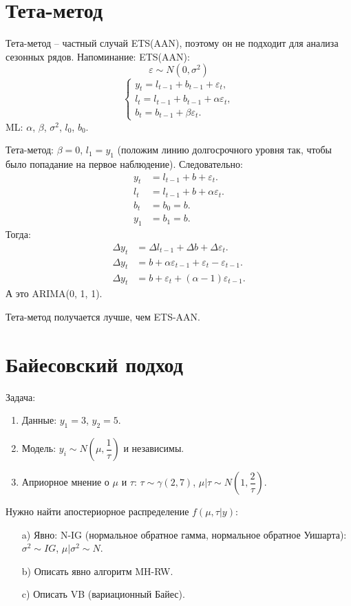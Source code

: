 \documentclass[10pt, a4paper]{extarticle}
\begin{document}
\section{Тета-метод}

Тета-метод -- частный случай ETS(AAN), поэтому он не подходит для анализа сезонных рядов. Напоминание: ETS(AAN):
\[
\varepsilon \sim N(0, \sigma^2)
\]
\[
\begin{cases}
	y_t = l_{t-1} + b_{t-1} + \varepsilon_t, \\
	l_t =  l_{t-1} + b_{t-1} + \alpha\varepsilon_t, \\
	b_t = b_{t-1} + \beta\varepsilon_t.
\end{cases}
\]
ML: $\alpha$, $\beta$, $\sigma^2$, $l_0$, $b_0$.

Тета-метод: $\beta = 0$, $l_1 = y_1$ (положим линию долгосрочного уровня так, чтобы было попадание на первое наблюдение). Следовательно:
\begin{align*}
	y_t &= l_{t-1} + b + \varepsilon_t. \\
	l_t &= l_{t-1} + b + \alpha\varepsilon_t. \\
	b_t &= b_0 = b. \\
	y_1 &= b_1 = b.
\end{align*}
Тогда:
\begin{align*}
\Delta y_t &= \Delta l_{t-1} + \Delta b + \Delta \varepsilon_t. \\
\Delta y_t &= b + \alpha \varepsilon_{t-1} + \varepsilon_t - \varepsilon_{t-1}. \\
\Delta y_t &= b + \varepsilon_t + (\alpha - 1)\varepsilon_{t-1}.
\end{align*}
А это ARIMA(0, 1, 1).

Тета-метод получается лучше, чем ETS-AAN.

\section{Байесовский подход}

Задача:
\begin{enumerate}
	\item Данные: $y_1 = 3$, $y_2 = 5$.
	\item Модель: $y_i \sim N(\mu, \dfrac{1}{\tau})$ и независимы. 
	\item Априорное мнение о $\mu$ и $\tau$: $\tau \sim \gamma(2, 7)$, $\mu | \tau \sim N(1, \dfrac{2}{\tau})$.
\end{enumerate}

Нужно найти апостериорное распределение $f(\mu, \tau | y)$:
\begin{enumerate}
	\item[a)] Явно: N-IG (нормальное обратное гамма, нормальное обратное Уишарта): $\sigma^2 \sim IG$, $\mu | \sigma^2 \sim N$.
	\item[b)] Описать явно алгоритм MH-RW.
	\item[c)] Описать VB (вариационный Байес).
\end{enumerate}
\end{document}
